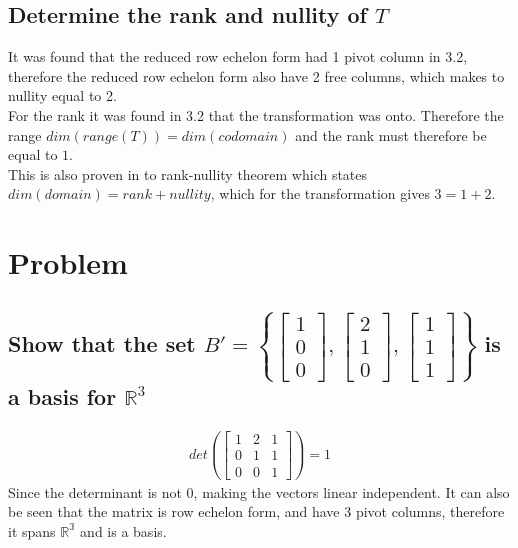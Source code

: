 \documentclass[12pt, a4paper]{article}
\begin{document}
		\subsection{Determine the rank and nullity of $T$}
			It was found that the reduced row echelon form had 1 pivot column in 3.2, therefore the reduced row echelon form also have 2 free columns, which makes to nullity equal to 2.\\
			For the rank it was found in 3.2 that the transformation was onto. Therefore the range $dim(range(T))=dim(codomain)$ and the rank must therefore be equal to $1$.\\
			This is also proven in to rank-nullity theorem which states $dim(domain)=rank+nullity$, which for the transformation gives $3=1+2$.
	\clearpage
	\section{Problem}
		\subsection{Show that the set $B'=\left\{\begin{bmatrix}1\\0\\0\end{bmatrix},\begin{bmatrix}2\\1\\0\end{bmatrix},\begin{bmatrix}1\\1\\1\end{bmatrix}\right\}$ is a basis for $\mathbb{R}^3$}
			\begin{align*}
				det\left(\begin{bmatrix}1&2&1\\0&1&1\\0&0&1\end{bmatrix}\right)=1
			\end{align*}
			Since the determinant is not 0, making the vectors linear independent. It can also be seen that the matrix is row echelon form, and have 3 pivot columns, therefore it spans $\mathbb{R^3}$ and is a basis.
\end{document}
